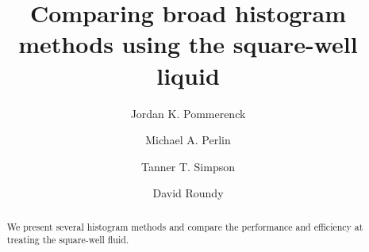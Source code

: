 \documentclass[letterpaper,twocolumn,amsmath,amssymb,pre,aps,10pt]{revtex4-1}
\begin{document}
\title{Comparing broad histogram methods using the square-well liquid}

\author{Jordan K. Pommerenck} \author{Michael A. Perlin}
\author{Tanner T. Simpson} \author{David Roundy}

\begin{abstract}
  We present several histogram methods and compare the performance and efficiency at treating the square-well fluid.
\end{abstract}

\maketitle





\end{document}
